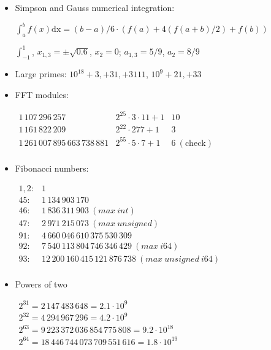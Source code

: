 \begin{itemize}
\item Simpson and Gauss numerical integration:

$\int_a^b f(x) \mathrm{dx} = (b-a)/6 \cdot(f(a) + 4(f(a+b)/2) + f(b))$

$\int_{-1}^1$, $x_{1,3} = \pm \sqrt{0.6}$, $x_2=0$; $a_{1,3} = 5/9$, $a_2 = 8/9$

\item Large primes: $10^{18} +3, +31, +3111$, $10^9+21, +33$

\item FFT modules:

$\begin{array}{lll}
1\,107\,296\,257 & 2^{25} \cdot 3 \cdot 11 + 1 & 10 \\
1\,161\,822\,209 & 2^{22} \cdot 277 + 1 & 3 \\
1\,261\,007\,895\,663\,738\,881 & 2^{55} \cdot 5 \cdot 7 + 1 & 6 \mathrm{\ (check)} \\
\end{array}$

\item Fibonacci numbers:

$\begin{array}{rl}
1, 2: & 1 \\
45: & 1\,134\,903\,170 \\
46: & 1\,836\,311\,903\ (max\ int) \\
47: & 2\,971\,215\,073\ (max\ unsigned) \\
91: & 4\,660\,046\,610\,375\,530\,309 \\
92: & 7\,540\,113\,804\,746\,346\,429\ (max\ i64) \\
93: & 12\,200\,160\,415\,121\,876\,738\ (max\ unsigned\ i64) \\
\end{array}$


\item Powers of two

$\begin{array}{l}
2^{31} = 2\,147\,483\,648 = 2.1\cdot10^9 \\
2^{32} = 4\,294\,967\,296 = 4.2\cdot10^9 \\
2^{63} = 9\,223\,372\,036\,854\,775\,808 = 9.2\cdot10^{18} \\
2^{64} = 18\,446\,744\,073\,709\,551\,616 = 1.8\cdot10^{19} \\
\end{array}$


\end{itemize}
